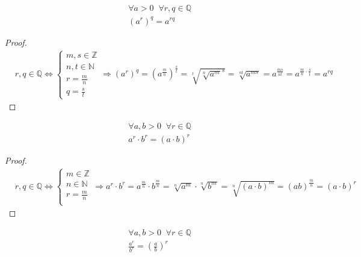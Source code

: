 \begin{theorem}
    \begin{align*}
        &\forall a > 0 \;\; \forall r, q \in \mathbb{Q} \\
        &(a^r)^q = a^{rq}
    \end{align*}
\end{theorem}

\begin{proof}
    \begin{align*}
        &r, q \in \mathbb{Q} \iff
        \left\{\begin{array}{l}
            m,s \in \mathbb{Z} \\
            n,t \in \mathbb{N} \\
            r = \frac{m}{n} \\
            q = \frac{s}{t}
        \end{array}\right. \Rightarrow
        (a^r)^q = (a^\frac{m}{n})^\frac{s}{t} = \sqrt[t]{\sqrt[n]{a^m}^s} = \sqrt[nt]{a^{ms}} = a^{\frac{ms}{nt}}
        = a^{\frac{m}{n} \cdot \frac{s}{t}} = a^{rq}
    \end{align*}
\end{proof}

\begin{theorem}
    \begin{align*}
        &\forall a, b > 0 \;\; \forall r \in \mathbb{Q} \\
        &a^r \cdot b^r = (a \cdot b)^r
    \end{align*}
\end{theorem}

\begin{proof}
    \begin{align*}
        &r, q \in \mathbb{Q} \iff
        \left\{\begin{array}{l}
            m \in \mathbb{Z} \\
            n \in \mathbb{N} \\
            r = \frac{m}{n} \\
        \end{array}\right. \Rightarrow
        a^r \cdot b^r = a^\frac{m}{n} \cdot b^\frac{m}{n} = \sqrt[n]{a^m} \cdot \sqrt[n]{b^m} = \sqrt[n]{(a \cdot b)^m} = (ab)^\frac{m}{n}
        = (a \cdot b)^r
    \end{align*}
\end{proof}

\begin{theorem}
    \begin{align*}
        &\forall a, b > 0 \;\; \forall r \in \mathbb{Q} \\
        &\frac{a^r}{b^r}  = \left(\frac{a}{b}\right)^r
    \end{align*}
\end{theorem}

